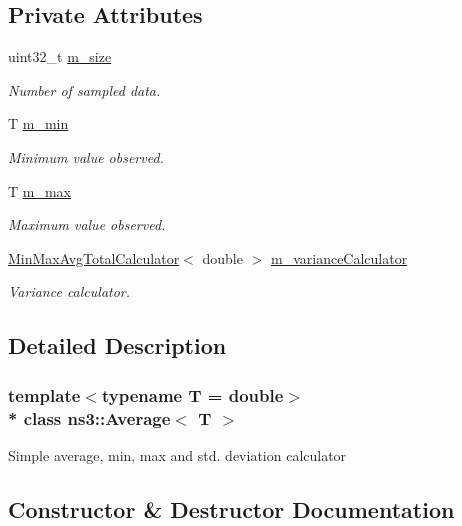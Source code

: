 \subsection*{Private Attributes}
\begin{DoxyCompactItemize}
\item 
uint32\+\_\+t \hyperlink{classns3_1_1Average_a4b64f80b73a52adc145b7712804dd5bc}{m\+\_\+size}
\begin{DoxyCompactList}\small\item\em Number of sampled data. \end{DoxyCompactList}\item 
T \hyperlink{classns3_1_1Average_a52a76e0aac81331ae4e05512e901b5ef}{m\+\_\+min}
\begin{DoxyCompactList}\small\item\em Minimum value observed. \end{DoxyCompactList}\item 
T \hyperlink{classns3_1_1Average_a0a2491927f01c097ded6f798ecf49ba7}{m\+\_\+max}
\begin{DoxyCompactList}\small\item\em Maximum value observed. \end{DoxyCompactList}\item 
\hyperlink{classns3_1_1MinMaxAvgTotalCalculator}{Min\+Max\+Avg\+Total\+Calculator}$<$ double $>$ \hyperlink{classns3_1_1Average_ad9ad5a2019b36ba70927c40e4d9ed4f2}{m\+\_\+variance\+Calculator}
\begin{DoxyCompactList}\small\item\em Variance calculator. \end{DoxyCompactList}\end{DoxyCompactItemize}


\subsection{Detailed Description}
\subsubsection*{template$<$typename T = double$>$\\*
class ns3\+::\+Average$<$ T $>$}

Simple average, min, max and std. deviation calculator 

\subsection{Constructor \& Destructor Documentation}
